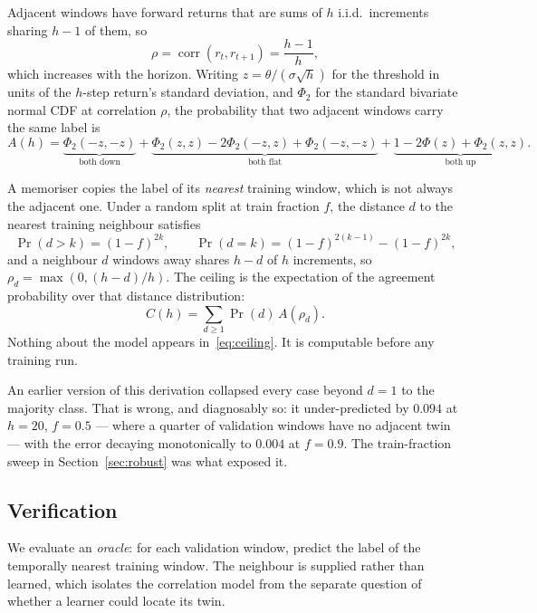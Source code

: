 \documentclass[11pt,a4paper]{article}
\begin{document}
Adjacent windows have forward returns that are sums of $h$ i.i.d.\ increments
sharing $h-1$ of them, so
\begin{equation}
\rho = \operatorname{corr}(r_t, r_{t+1}) = \frac{h-1}{h},
\label{eq:rho}
\end{equation}
which increases with the horizon. Writing $z = \theta/(\sigma\sqrt{h})$ for the
threshold in units of the $h$-step return's standard deviation, and $\Phi_2$ for
the standard bivariate normal CDF at correlation $\rho$, the probability that
two adjacent windows carry the same label is
\begin{equation}
A(h) = \underbrace{\Phi_2(-z,-z)}_{\text{both down}}
     + \underbrace{\Phi_2(z,z) - 2\Phi_2(-z,z) + \Phi_2(-z,-z)}_{\text{both flat}}
     + \underbrace{1 - 2\Phi(z) + \Phi_2(z,z)}_{\text{both up}} .
\end{equation}

A memoriser copies the label of its \emph{nearest} training window, which is not
always the adjacent one. Under a random split at train fraction $f$, the distance
$d$ to the nearest training neighbour satisfies
\begin{equation}
\Pr(d > k) = (1-f)^{2k}, \qquad
\Pr(d = k) = (1-f)^{2(k-1)} - (1-f)^{2k},
\end{equation}
and a neighbour $d$ windows away shares $h-d$ of $h$ increments, so
$\rho_d = \max(0, (h-d)/h)$. The ceiling is the expectation of the agreement
probability over that distance distribution:
\begin{equation}
C(h) = \sum_{d \geq 1} \Pr(d)\, A(\rho_d).
\label{eq:ceiling}
\end{equation}
Nothing about the model appears in~\eqref{eq:ceiling}. It is computable before
any training run.

An earlier version of this derivation collapsed every case beyond $d=1$ to the
majority class. That is wrong, and diagnosably so: it under-predicted by $0.094$
at $h=20$, $f=0.5$ --- where a quarter of validation windows have no adjacent
twin --- with the error decaying monotonically to $0.004$ at $f=0.9$. The
train-fraction sweep in Section~\ref{sec:robust} was what exposed it.

\subsection{Verification}

We evaluate an \emph{oracle}: for each validation window, predict the label of
the temporally nearest training window. The neighbour is supplied rather than
learned, which isolates the correlation model from the separate question of
whether a learner could locate its twin.
\end{document}
